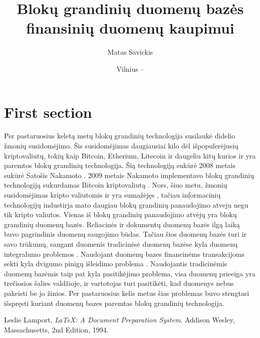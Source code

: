 \documentclass{VUMIFPSkursinis}
\title{Blokų grandinių duomenų bazės finansinių duomenų kaupimui}
\author{Matas Savickis}
\date{Vilnius – \the\year}
\begin{document}
\maketitle

\tableofcontents


\section{First section}
Per pastaruosius keletą metų blokų grandinių technologija susilaukė didelio žmonių susidomėjimo. 
Šis susidomėjimas daugiausiai kilo dėl išpopulerėjusių kriptovaliutų, tokių kaip Bitcoin, Etherium, Litecoin ir daugeliu kitų 
kurios ir yra paremtos blokų grandinių technologija. Šią technologiją sukūrė 2008 metais sukūrė Satošis Nakamoto%
. 
2009 metais Nakamoto implementavo blokų grandinių technologiją sukurdamas Bitcoin kriptovaliutą %
. 
Nors, šiuo metu, \cite{lampost94}žmonių susidomėjimas kripto valiutomis ir yra sumažėjęs %
, tačiau informacinių technologijų industirja 
mato daugiau blokų grandinių panaudojimo atveju negu tik kripto valiutos. Vienas iš blokų grandinių panaudojimo atvėjų yra 
blokų grandinių duomenų bazės. Reliacinės ir dokumentų duomenų bazės ilgą laiką buvo pagrindinis duomenų saugojimo būdas. 
Tačiau šios duomenų bazės turi ir savo trūkumų, saugant duomenis tradicinėsė duomenų bazėse kyla duomenų integralumo problemos %
. 
Naudojant duomenų bazes financinėms transakcijoms sekti kyla dvigumo pinigų išleidimo problema%
. Naudojantis tradicinėmis duomenų bazėmis 
taip pat kyla pasitikėjimo problema, visa duomenų prieeiga yra trečiosios šalies valdžioje, ir vartotojas turi pasitikėti, kad duomenys nebus pakeisti be jo žinios.
Per pastaruosius kelis metus šias problemas buvo stengtasi išspręsti kuriant duomenų bazes paremtas blokų grandinių technologija.

\begin{thebibliography}{999}

  Leslie Lamport,
  \emph{\LaTeX: A Document Preparation System}.
  Addison Wesley, Massachusetts,
  2nd Edition,
  1994.

\end{thebibliography}








\end{document}
